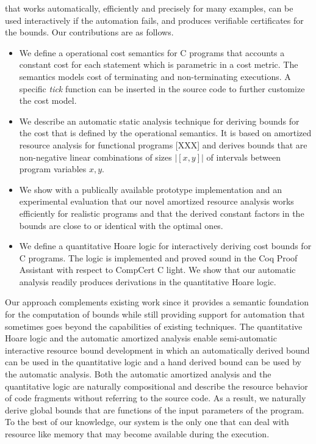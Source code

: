 \documentclass[nocopyrightspace,preprint]{sigplanconf}
\begin{document}
that works automatically, efficiently and precisely for many examples,
can be used interactively if the automation fails, and produces
verifiable certificates for the bounds.  Our contributions are as
follows.
%
\begin{itemize}
\item We define a operational cost semantics for C programs that
  accounts a constant cost for each statement which is parametric in a
  cost metric.  The semantics models cost of terminating and
  non-terminating executions.  A specific \emph{tick} function can be
  inserted in the source code to further customize the cost
  model.
\item We describe an automatic static analysis technique for deriving
  bounds for the cost that is defined by the operational semantics.
  It is based on amortized resource analysis for functional programs
  [XXX] and derives bounds that are non-negative linear combinations
  of sizes $|[x,y]|$ of intervals between program variables $x,y$.
\item We show with a publically available prototype implementation and
  an experimental evaluation that our novel amortized resource
  analysis works efficiently for realistic programs and that the
  derived constant factors in the bounds are close to or identical
  with the optimal ones.
\item We define a quantitative Hoare logic for interactively deriving
  cost bounds for C programs.  The logic is implemented and proved
  sound in the Coq Proof Assistant with respect to CompCert C
  light.  We show that our automatic analysis readily produces
  derivations in the quantitative Hoare logic.
\end{itemize}
%
Our approach complements existing work since it provides a semantic
foundation for the computation of bounds while still providing support
for automation that sometimes goes beyond the capabilities of existing
techniques.  The quantitative Hoare logic and the automatic amortized
analysis enable semi-automatic interactive resource bound development
in which an automatically derived bound can be used in the
quantitative logic and a hand derived bound can be used by the
automatic analysis.  Both the automatic amortized analysis and the
quantitative logic are naturally compositional and describe the
resource behavior of code fragments without referring to the source
code.  As a result, we naturally derive global bounds that are
functions of the input parameters of the program.  To the best of our
knowledge, our system is the only one that can deal with resource like
memory that may become available during the execution.
\end{document}
